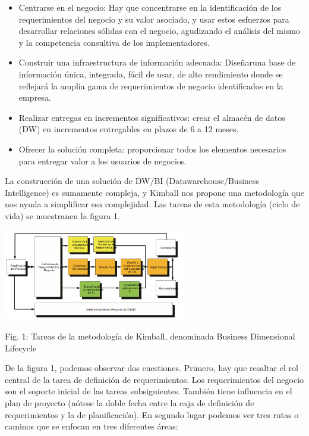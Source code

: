 \documentclass[%
 reprint,
 amsmath,amssymb,
 aps,
]{revtex4-1}
\begin{document}
\begin{itemize}
	\item Centrarse en el negocio: Hay que concentrarse en la identificación de los requerimientos del negocio y su valor asociado, y usar estos esfuerzos para desarrollar relaciones sólidas con el negocio, agudizando el análisis del mismo y la competencia consultiva de los implementadores. 
	\item Construir una infraestructura de información adecuada: Diseñaruna base de información única, integrada, fácil de usar, de alto rendimiento donde se reflejará la amplia gama de requerimientos de negocio identificados en la empresa. 
	\item Realizar entregas en incrementos significativos: crear el almacén de datos (DW) en incrementos entregables en plazos de 6 a 12 meses.
	\item Ofrecer la solución completa: proporcionar todos los elementos necesarios para entregar valor a los usuarios de negocios. 
\end{itemize}

La construcción de una solución de DW/BI (Datawarehouse/Business Intelligence) es sumamente compleja, y Kimball nos propone una metodología que nos ayuda a simplificar esa complejidad. Las tareas de esta metodología (ciclo de vida) se muestranen la figura 1.

				\begin{center}
					\includegraphics[width=8cm]{./IMAGENES/img01}
				\end{center}
				
Fig. 1: Tareas de la metodología de Kimball, denominada Business Dimensional Lifecycle 

De la figura 1, podemos observar dos cuestiones. Primero, hay que resaltar el rol central de la tarea de definición de requerimientos. Los requerimientos del negocio son el soporte inicial de las tareas subsiguientes. También tiene influencia en el plan de proyecto (nótese la doble fecha entre la caja de definición de requerimientos y la de planificación). En segundo lugar podemos ver tres rutas o caminos que se enfocan en tres diferentes áreas:
\end{document}
